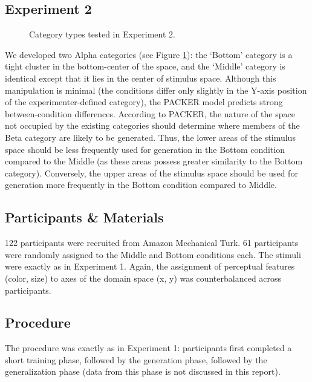 \documentclass[12pt]{article}
\begin{document}
\begin{flushleft}
\clearpage

\section{Experiment 2}


\begin{figure}
    \begin{center}
    
    \caption{Category types tested in Experiment 2.}
    \label{fig:e2-conditions}
    \end{center}
\end{figure}

We developed two Alpha categories (see Figure \ref{fig:e2-conditions}): the `Bottom' category is a tight cluster in the bottom-center of the space, and the `Middle' category is identical except that it lies in the center of stimulus space. Although this manipulation is minimal (the conditions differ only slightly in the Y-axis position of the experimenter-defined category), the PACKER model predicts strong between-condition differences. According to PACKER, the nature of the space not occupied by the existing categories should determine where members of the Beta category are likely to be generated. Thus, the lower areas of the stimulus space should be less frequently used for generation in the Bottom condition compared to the Middle (as these areas possess greater similarity to the Bottom category). Conversely, the upper areas of the stimulus space should be used for generation more frequently in the Bottom condition compared to Middle.


\subsection{Participants \& Materials}

122 participants were recruited from Amazon Mechanical Turk. 61 participants were randomly assigned to the Middle and Bottom conditions each. The stimuli were exactly as in Experiment 1. Again, the assignment of perceptual features (color, size) to axes of the domain space (x, y) was counterbalanced across participants.

\subsection{Procedure}

The procedure was exactly as in Experiment 1: participants first completed a short training phase, followed by the generation phase, followed by the generalization phase (data from this phase is not discussed in this report).













\end{flushleft}
\end{document}

